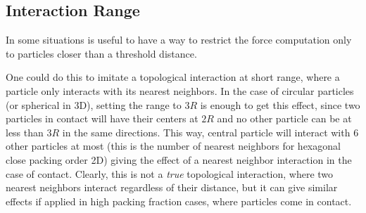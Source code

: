 \documentclass[../../master_thesis_np.tex]{subfiles}
\begin{document}
		
	\subsection{Interaction Range} \label{intrange}
	In some situations is useful to have a way to restrict the force computation only to particles closer than a threshold distance.
		
	One could do this to imitate a topological interaction at short range, where a particle only interacts with its nearest neighbors. 
	In the case of circular particles (or spherical in 3D), setting the range to $3R$ is enough to get this effect, since two particles in contact will have their centers at $2R$ and no other particle can be at less than $3R$ in the same directions. 
	This way, central particle will interact with 6 other particles at most (this is the number of nearest neighbors for hexagonal close packing order 2D) giving the effect of a nearest neighbor interaction in the case of contact. 
	Clearly, this is not a \emph{true} topological interaction, where two nearest neighbors interact regardless of their distance, but it can give similar effects if applied in high packing fraction cases, where particles come in contact.
	
\end{document}
